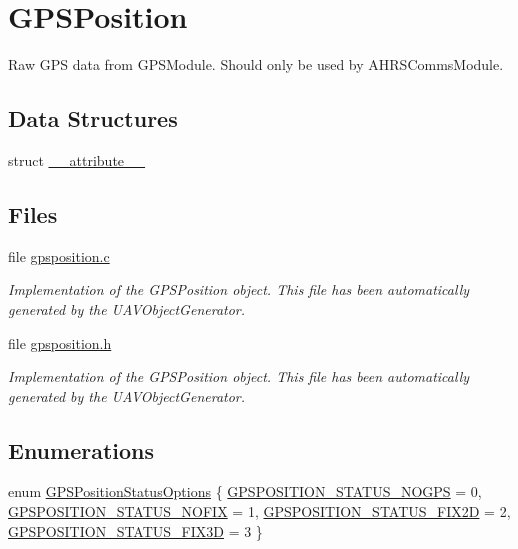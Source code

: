 \hypertarget{group___g_p_s_position}{\section{\-G\-P\-S\-Position}
\label{group___g_p_s_position}
}


\-Raw \-G\-P\-S data from \-G\-P\-S\-Module. \-Should only be used by \-A\-H\-R\-S\-Comms\-Module.  


\subsection*{\-Data \-Structures}
\begin{DoxyCompactItemize}
\item 
struct \hyperlink{struct____attribute____}{\-\_\-\-\_\-attribute\-\_\-\-\_\-}
\end{DoxyCompactItemize}
\subsection*{\-Files}
\begin{DoxyCompactItemize}
\item 
file \hyperlink{gpsposition_8c}{gpsposition.\-c}
\begin{DoxyCompactList}\small\item\em \-Implementation of the \-G\-P\-S\-Position object. \-This file has been automatically generated by the \-U\-A\-V\-Object\-Generator. \end{DoxyCompactList}\item 
file \hyperlink{gpsposition_8h}{gpsposition.\-h}
\begin{DoxyCompactList}\small\item\em \-Implementation of the \-G\-P\-S\-Position object. \-This file has been automatically generated by the \-U\-A\-V\-Object\-Generator. \end{DoxyCompactList}\end{DoxyCompactItemize}
\subsection*{\-Enumerations}
\begin{DoxyCompactItemize}
\item 
enum \hyperlink{group___g_p_s_position_ga5992105052f155e8055339cbb93eb332}{\-G\-P\-S\-Position\-Status\-Options} \{ \hyperlink{group___g_p_s_position_gga5992105052f155e8055339cbb93eb332ac94e589afcc01aaf42466cc9d65e350f}{\-G\-P\-S\-P\-O\-S\-I\-T\-I\-O\-N\-\_\-\-S\-T\-A\-T\-U\-S\-\_\-\-N\-O\-G\-P\-S} = 0, 
\hyperlink{group___g_p_s_position_gga5992105052f155e8055339cbb93eb332aa5dd14c38b62d754f157177dd3949fc8}{\-G\-P\-S\-P\-O\-S\-I\-T\-I\-O\-N\-\_\-\-S\-T\-A\-T\-U\-S\-\_\-\-N\-O\-F\-I\-X} = 1, 
\hyperlink{group___g_p_s_position_gga5992105052f155e8055339cbb93eb332a48384bc369b64a62050da36ee7bcc874}{\-G\-P\-S\-P\-O\-S\-I\-T\-I\-O\-N\-\_\-\-S\-T\-A\-T\-U\-S\-\_\-\-F\-I\-X2\-D} = 2, 
\hyperlink{group___g_p_s_position_gga5992105052f155e8055339cbb93eb332a37fb7b6f826e5673f517178a827ee96f}{\-G\-P\-S\-P\-O\-S\-I\-T\-I\-O\-N\-\_\-\-S\-T\-A\-T\-U\-S\-\_\-\-F\-I\-X3\-D} = 3
 \}
\end{DoxyCompactItemize}
